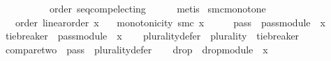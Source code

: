 \begin{isabellebody}
\ \ \ \ \ \ \ \ \ \ order\ seq{\isacharunderscore}{\kern0pt}comp{\isacharunderscore}{\kern0pt}electing\isanewline
\ \ \ \ \isamarkupfalse%
\ metis\isanewline
{}\isamarkupfalse%
%
\endisatagproof
{\isafoldproof}%
%
\isadelimproof
%
\endisadelimproof
%
\isadelimdocument
%
\endisadelimdocument
%
\isatagdocument
%
\isamarkuptrue%
%
\endisatagdocument
{\isafolddocument}%
%
\isadelimdocument
%
\endisadelimdocument
{}\isamarkupfalse%
\ smc{\isacharunderscore}{\kern0pt}monotone{\isacharcolon}{\kern0pt}\isanewline
\ \ \ order{\isacharcolon}{\kern0pt}\ {\isachardoublequoteopen}linear{\isacharunderscore}{\kern0pt}order\ x{\isachardoublequoteclose}\isanewline
\ \ \ {\isachardoublequoteopen}monotonicity\ {\isacharparenleft}{\kern0pt}smc\ x{\isacharparenright}{\kern0pt}{\isachardoublequoteclose}\isanewline
%
\isadelimproof
%
\endisadelimproof
%
\isatagproof
{}\isamarkupfalse%
\ {\isacharminus}{\kern0pt}\isanewline
\isanewline
\ \ \isamarkupfalse%
\ {\isacharquery}{\kern0pt}pass{}\ {\isacharequal}{\kern0pt}\ {\isachardoublequoteopen}pass{\isacharunderscore}{\kern0pt}module\ {}\ x{\isachardoublequoteclose}\isanewline
\ \ \isamarkupfalse%
\ {\isacharquery}{\kern0pt}tie{\isacharunderscore}{\kern0pt}breaker\ {\isacharequal}{\kern0pt}\ {\isachardoublequoteopen}{\isacharparenleft}{\kern0pt}pass{\isacharunderscore}{\kern0pt}module\ {}\ x{\isacharparenright}{\kern0pt}{\isachardoublequoteclose}\isanewline
\ \ \isamarkupfalse%
\ {\isacharquery}{\kern0pt}plurality{\isacharunderscore}{\kern0pt}defer\ {\isacharequal}{\kern0pt}\ {\isachardoublequoteopen}{\isacharparenleft}{\kern0pt}plurality{\isasymdown}{\isacharparenright}{\kern0pt}\ {\isasymtriangleright}\ {\isacharquery}{\kern0pt}tie{\isacharunderscore}{\kern0pt}breaker{\isachardoublequoteclose}\isanewline
\ \ \isamarkupfalse%
\ {\isacharquery}{\kern0pt}compare{\isacharunderscore}{\kern0pt}two\ {\isacharequal}{\kern0pt}\ {\isachardoublequoteopen}{\isacharquery}{\kern0pt}pass{}\ {\isasymtriangleright}\ {\isacharquery}{\kern0pt}plurality{\isacharunderscore}{\kern0pt}defer{\isachardoublequoteclose}\isanewline
\ \ \isamarkupfalse%
\ {\isacharquery}{\kern0pt}drop{}\ {\isacharequal}{\kern0pt}\ {\isachardoublequoteopen}drop{\isacharunderscore}{\kern0pt}module\ {}\ x{\isachardoublequoteclose}\isanewline
\ \ \isamarkupfalse%

\end{isabellebody}
